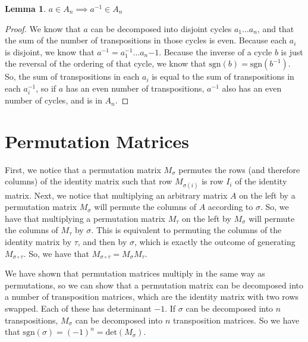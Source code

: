 \documentclass[12pt]{article}
\newtheorem{lemma}{Lemma}
\begin{document}
\begin{lemma}
$a \in A_n \implies a^{-1} \in A_n$
\end{lemma}
\begin{proof}
We know that $a$ can be decomposed into disjoint cycles $a_1\ldots a_n$, and that the sum of the number of transpositions in those cycles is even. Because each $a_i$ is disjoint, we know that $a^{-1} = a_1^{-1}\ldots a_n{-1}$. Because the inverse of a cycle $b$ is just the reversal of the ordering of that cycle, we know that $\mathrm{sgn}(b) = \mathrm{sgn}(b^{-1})$. So, the sum of transpositions in each $a_i$ is equal to the sum of transpositions in each $a_i^{-1}$, so if $a$ has an even number of transpositions, $a^{-1}$ also has an even number of cycles, and is in $A_n$.
\end{proof}


\section{Permutation Matrices}
First, we notice that a permutation matrix $M_\sigma$ permutes the rows (and therefore columns) of the identity matrix such that row $M_{\sigma(i)}$ is row $I_i$ of the identity matrix. Next, we notice that multiplying an arbitrary matrix $A$ on the left by a permutation matrix $M_\sigma$ will permute the columns of $A$ according to $\sigma$. So, we have that multiplying a permutation matrix $M_\tau$ on the left by $M_\sigma$ will permute the columns of $M_\tau$ by $\sigma$. This is equivalent to permuting the columns of the identity matrix by $\tau$, and then by $\sigma$, which is exactly the outcome of generating $M_{\sigma \circ \tau}$. So, we have that $M_{\sigma \circ \tau} = M_\sigma M_\tau$.

We have shown that permutation matrices multiply in the same way as permutations, so we can show that a permutation matrix can be decomposed into a number of transposition matrices, which are the identity matrix with two rows swapped. Each of these has determinant $-1$. If $\sigma$ can be decomposed into $n$ transpositions, $M_\sigma$ can be decomposed into $n$ transposition matrices. So we have that $\mathrm{sgn}(\sigma) = (-1)^n = \mathrm{det}(M_\sigma)$.
\end{document}
